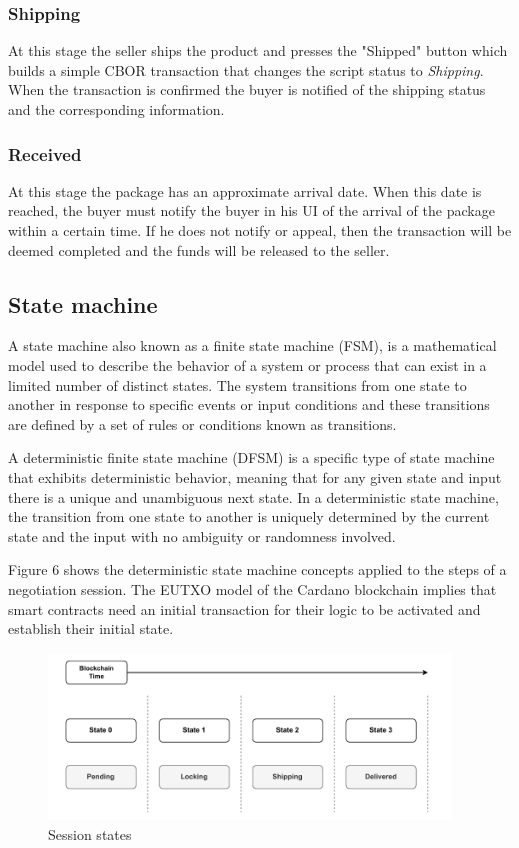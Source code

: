 \documentclass[12pt]{article}
\begin{document}
\subsubsection { Shipping }

At this stage the seller ships the product and presses the "Shipped" button which builds a simple CBOR transaction that changes the script status to \emph{Shipping}. When the transaction is confirmed the buyer is notified of the shipping status and the corresponding information.

\subsubsection { Received }

At this stage the package has an approximate arrival date. When this date is reached, the buyer must notify the buyer in his UI of the arrival of the package within a certain time. If he does not notify or appeal, then the transaction will be deemed completed and the funds will be released to the seller.


\subsection { State machine }
A state machine also known as a finite state machine (FSM), is a mathematical model used to describe the behavior of a system or process that can exist in a limited number of distinct states. The system transitions from one state to another in response to specific events or input conditions and these transitions are defined by a set of rules or conditions known as transitions.

A deterministic finite state machine (DFSM) is a specific type of state machine that exhibits deterministic behavior, meaning that for any given state and input there is a unique and unambiguous next state. In a deterministic state machine, the transition from one state to another is uniquely determined by the current state and the input with no ambiguity or randomness involved.

Figure 6 shows the deterministic state machine concepts applied to the steps of a negotiation session. 
The EUTXO model of the Cardano blockchain implies that smart contracts need an initial transaction for their logic to be activated and establish their initial state.

\begin{figure}[ht]
  \centering
  \includegraphics[width=0.95\textwidth]{machine.pdf}
  \caption{Session states}
  \label{fig:States}
\end{figure}
\end{document}
